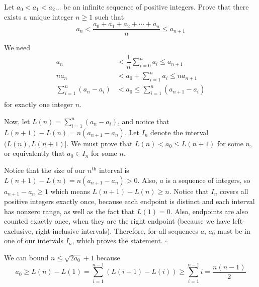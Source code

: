 
\begin{problem}[ISL 2014 A1]
    Let $a_0 < a_1 < a_2 \ldots$ be an infinite sequence of positive integers. Prove that there exists a unique integer $n\geq 1$ such that
    \[a_n < \frac{a_0+a_1+a_2+\cdots+a_n}{n} \leq a_{n+1}\]
\end{problem}

\begin{solution}
    We need \begin{align*}
    a_n &< \dfrac1n\sum_{i=0}^na_i \leq a_{n+1}\\
    na_n &< a_0+\sum_{i=1}^na_i \leq na_{n+1}\\
    \sum_{i=1}^n(a_n-a_i) &< a_0 \leq \sum_{i=1}^n(a_{n+1}-a_i)\\
    \end{align*}
    for exactly one integer $n$.
    
    Now, let $L(n) = \sum_{i=1}^n(a_n-a_i)$, and notice that $L(n+1)-L(n)=n(a_{n+1}-a_n)$. Let $I_n$ denote the interval $(L(n), L(n+1)]$. We must prove that $L(n) < a_0 \leq L(n+1)$ for some $n$, or equivalently that
    $a_0 \in I_n$ for some $n$.
    
    Notice that the size of our $n^\textrm{th}$ interval is $L(n+1)-L(n) = n(a_{n+1}-a_n) > 0$. Also, $a$ is a sequence of integers, so $a_{n+1}-a_n \geq 1$ which means $L(n+1)-L(n) \geq n$. Notice that $I_n$ covers all positive integers exactly once, because each endpoint is distinct and each interval has nonzero range, as well as the fact that $L(1)=0$. Also, endpoints are also counted exactly once, when they are the right endpoint (because we have left-exclusive, right-inclusive intervals). Therefore, for all sequences $a$, $a_0$ must be in one of our intervals $I_n$, which proves the statement. $\square$
    
    \begin{remark}
    We can bound $n \leq \sqrt{2a_0}+1$ because \[a_0 \geq L(n)-L(1) = \displaystyle{\sum_{i=1}^{n-1}(L(i+1)-L(i))} \geq \sum_{i=1}^{n-1} i = \dfrac{n(n-1)}{2}\]
    \end{remark}
\end{solution}
